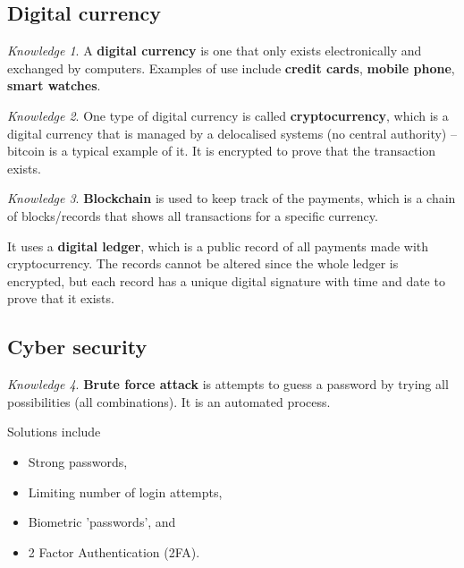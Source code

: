 \documentclass[8pt]{article}
\theoremstyle{remark}
\newtheorem{knowledge}{Knowledge}[subsection]
\begin{document}
        \subsection{Digital currency}
            \begin{knowledge}
                A \textbf{digital currency} is one that only exists electronically and exchanged by computers. Examples of use include \textbf{credit cards}, \textbf{mobile phone}, \textbf{smart watches}.
            \end{knowledge}

            \begin{knowledge}
                One type of digital currency is called \textbf{cryptocurrency}, which is a digital currency that is managed by a delocalised systems (no central authority) -- bitcoin is a typical example of it. It is encrypted to prove that the transaction exists.
            \end{knowledge}

            \begin{knowledge}
                \textbf{Blockchain} is used to keep track of the payments, which is a chain of blocks/records that shows all transactions for a specific currency.
                
                It uses a \textbf{digital ledger}, which is a public record of all payments made with cryptocurrency. The records cannot be altered since the whole ledger is encrypted, but each record has a unique digital signature with time and date to prove that it exists.
            \end{knowledge}

        \subsection{Cyber security}
            \begin{knowledge}
                \textbf{Brute force attack} is attempts to guess a password by trying all possibilities (all combinations). It is an automated process.

                Solutions include
                \begin{itemize}
                    \item Strong passwords,
                    \item Limiting number of login attempts,
                    \item Biometric 'passwords', and
                    \item 2 Factor Authentication (2FA).
                \end{itemize}
            \end{knowledge}
\end{document}
